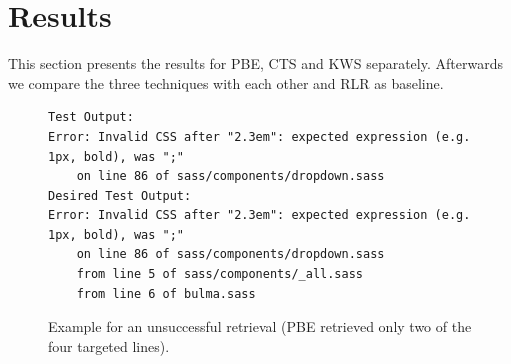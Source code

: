 \section{Results}
This section presents the results for PBE, CTS and KWS separately.
Afterwards we compare the three techniques with each other and RLR as
baseline.

\begin{figure}[!t]
  \centering
  \begin{lstlisting}[breaklines=true]
Test Output:
Error: Invalid CSS after "2.3em": expected expression (e.g.
1px, bold), was ";"
	on line 86 of sass/components/dropdown.sass
Desired Test Output:
Error: Invalid CSS after "2.3em": expected expression (e.g.
1px, bold), was ";"
	on line 86 of sass/components/dropdown.sass
	from line 5 of sass/components/_all.sass
	from line 6 of bulma.sass
  \end{lstlisting}
  \caption{Example for an unsuccessful retrieval (PBE retrieved only
  two of the four targeted lines).}
  \label{lst:pbe-unsuccessful}
\end{figure}

